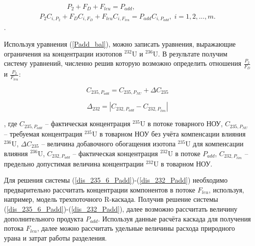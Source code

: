 \begin{equation} \label{Padd_bal} 
  \begin{array}{l} {\quad \quad \quad \quad {P_{2}+F_D+F_{leu}=P_{add}},} \\ {P_{2}C_{i,P_{2}} + F_DC_{i,F_D} + F_{leu}C_{i,F_{leu}}  = P_{add}C_{i,P_{add}} ,\; i=1,2,...,m.} \end{array} 
\end{equation}.

Используя уравнения (\ref{Padd_bal}), можно записать уравнения, выражающие ограничения на концентрации изотопов $^{232}$U и $^{236}$U.
В результате получим систему уравнений, численно решив которую возможно определить отношения $\frac{P_2}{F_D}$ и $\frac{P_2}{F_{leu}}$:

\begin{equation}\label{dis_235_6_Padd}
    C_{235,P_{add}} = C_{235,P_{NU}} + \Delta C_{235}
\end{equation}

\begin{equation}\label{dis_232_Padd}
    \Delta_{232}=\left|C_{232,P_{add}}-C_{232,P_{lim}}\right|
\end{equation}

, где $C_{235,P_{add}}$ -- фактическая концентрация $^{235}$U в потоке товарного НОУ, $C_{235,P_{NU}}$ -- требуемая концентрация $^{235}$U в товарном НОУ без учёта компенсации влияния $^{236}$U, $\Delta C_{235}$ -- величина добавочного обогащения изотопа $^{235}$U для компенсации влияния $^{236}$U, $C_{232,P_{add}}$ -- фактическая концентрация $^{232}$U в потоке $P_{add}$, $C_{232,P_{lim}}$ -- предельно допустимая величина концентрации $^{232}$U в товарном НОУ.

Для решения системы (\ref{dis_235_6_Padd})-(\ref{dis_232_Padd}) необходимо предварительно рассчитать концентрации компонентов в потоке $F_{leu}$, используя, например, модель трехпоточного R-каскада. Получив решение системы (\ref{dis_235_6_Padd})-(\ref{dis_232_Padd}), далее возможно рассчитать величину дополнительного продукта $P_{add}$. Используя данные расчёта каскада для получения потока $F_{leu}$, далее можно рассчитать удельные величины расхода природного урана и затрат работы разделения.  

